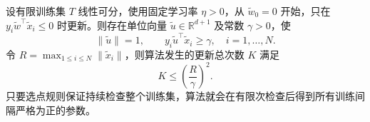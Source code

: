 \begin{theorem}
\label{thm:lh-perceptron-convergence}
设有限训练集 $T$ 线性可分，使用固定学习率 $\eta>0$，从 $\widetilde w_0=0$ 开始，只在 $y_i\widetilde w^\top\widetilde x_i\leq0$ 时更新。则存在单位向量 $\widetilde u\in\mathbb R^{d+1}$ 及常数 $\gamma>0$，使
\begin{equation}
\label{eq:lh-perceptron-separator-margin}
\|\widetilde u\|=1,
\qquad
y_i\widetilde u^\top\widetilde x_i\geq\gamma,
\quad i=1,\ldots,N.
\end{equation}
令 $R=\max_{1\leq i\leq N}\|\widetilde x_i\|$，则算法发生的更新总次数 $K$ 满足
\begin{equation}
\label{eq:lh-perceptron-mistake-bound}
K\leq\left(\frac{R}{\gamma}\right)^2.
\end{equation}
只要选点规则保证持续检查整个训练集，算法就会在有限次检查后得到所有训练间隔严格为正的参数。
\end{theorem}

